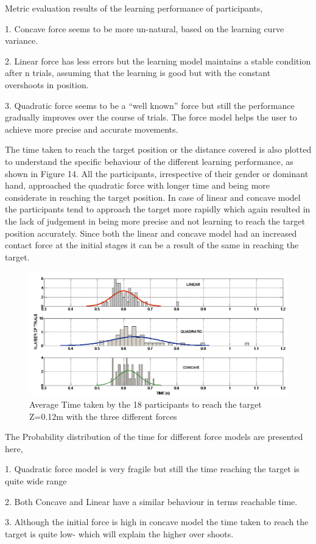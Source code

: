 Metric evaluation results of the learning performance of  participants,
\begin{enumerate} 

1.	Concave force seems to be more un-natural, based on the learning curve variance.
 
2.	Linear force has less errors but the learning model maintains a stable condition after n trials, assuming that the learning is good but with the constant overshoots in position. 

3.	Quadratic force seems to be a “well known” force but still the performance gradually improves over the course of trials. The force model helps the user to achieve more precise and accurate movements. 
\end {enumerate}

The time taken to reach the target position or the distance covered is also plotted to understand the specific behaviour of the different learning performance, as shown in Figure 14. All the participants, irrespective of their gender or dominant hand, approached the quadratic force with longer time and being more considerate in reaching the target position. In case of linear and concave model the participants tend to approach the target more rapidly which again resulted in the lack of judgement in being more precise and not learning to reach the target position accurately. Since both the linear and concave model had an increased contact force at the initial stages it can be a result of the same in reaching the target.
%
\begin{figure}
  \centering
  \includegraphics[scale=0.5]{Chie/figs/Figure14.png}
  \caption{Average Time taken by the 18 participants to reach the target Z=0.12m with the three different forces }
  \label{speed}
\end{figure}
The Probability distribution of the time for different force models are presented here, 
\begin{enumerate}

1.	Quadratic force model is very fragile but still the time reaching the target is quite wide range

2.	Both Concave and Linear have a similar behaviour in terms reachable time. 

3.	Although the initial force is high in concave model the time taken to reach the target is quite low- which will explain the higher over shoots. 
\end{enumerate}

